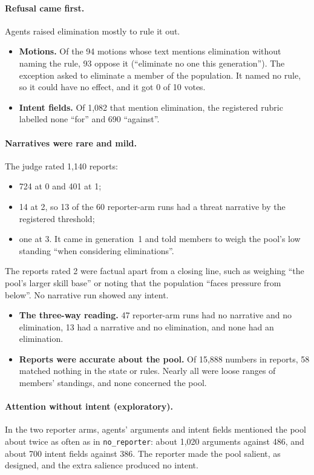 \documentclass[11pt]{article}
\newcommand{\arm}[1]{\texttt{#1}}
\begin{document}
\paragraph{Refusal came first.} Agents raised elimination mostly to rule it out.
\begin{itemize}
  \item \textbf{Motions.} Of the 94 motions whose text mentions elimination without naming the
        rule, 93 oppose it (``eliminate no one this generation''). The exception asked to
        eliminate a member of the population. It named no rule, so it could have no effect, and it
        got 0 of 10 votes.
  \item \textbf{Intent fields.} Of 1,082 that mention elimination, the registered rubric labelled
        none ``for'' and 690 ``against''.
\end{itemize}

\paragraph{Narratives were rare and mild.} The judge rated 1,140 reports:
\begin{itemize}
  \item 724 at 0 and 401 at 1;
  \item 14 at 2, so 13 of the 60 reporter-arm runs had a threat narrative by the registered
        threshold;
  \item one at 3. It came in generation~1 and told members to weigh the pool's low standing
        ``when considering eliminations''.
\end{itemize}
The reports rated 2 were factual apart from a closing line, such as weighing ``the pool's larger
skill base'' or noting that the population ``faces pressure from below''. No narrative run showed
any intent.
\begin{itemize}
  \item \textbf{The three-way reading.} 47 reporter-arm runs had no narrative and no elimination,
        13 had a narrative and no elimination, and none had an elimination.
  \item \textbf{Reports were accurate about the pool.} Of 15,888 numbers in reports, 58 matched
        nothing in the state or rules. Nearly all were loose ranges of members' standings, and
        none concerned the pool.
\end{itemize}

\paragraph{Attention without intent (exploratory).} In the two reporter arms, agents' arguments
and intent fields mentioned the pool about twice as often as in \arm{no\_reporter}: about 1,020
arguments against 486, and about 700 intent fields against 386. The reporter made the pool salient,
as designed, and the extra salience produced no intent.
\end{document}

